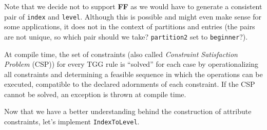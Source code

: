 Note that we decide not to support \textbf{FF} as we would have to generate a consistent pair of \texttt{index} and \texttt{level}. Although this is possible
and might even make sense for some applications, it does not in the context of partitions and entries (the pairs are not unique, so which pair should we take?
\texttt{partition2} set to \texttt{beginner}?).

At compile time, the set of constraints (also called \emph{Constraint Satisfaction Problem} (CSP)) for every TGG rule is ``solved'' for each case by
operationalizing all constraints and determining a feasible sequence in which the operations can be executed, compatible to the declared adornments of each
constraint. If the CSP cannot be solved, an exception is thrown at compile time.

Now that we have a better understanding behind the construction of attribute constraints, let's implement \texttt{IndexToLevel}.


